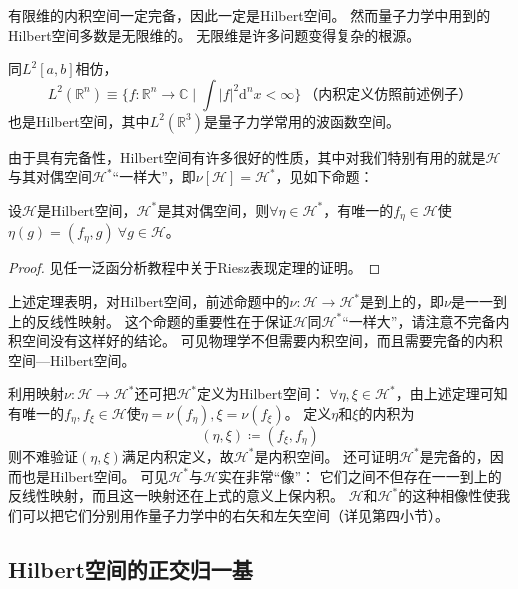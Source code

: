 \begin{note}
    有限维的内积空间一定完备，因此一定是Hilbert空间。
    然而量子力学中用到的Hilbert空间多数是无限维的。
    无限维是许多问题变得复杂的根源。
\end{note}

同$L^2[a, b]$相仿，
$$L^2(\mathbb{R}^n) \equiv \{f \colon \mathbb{R}^n \to \mathbb{C} \mid \int|f|^2\mathrm{d}^nx < \infty\} ~ \text{（内积定义仿照前述例子）}$$
也是Hilbert空间，其中$L^2(\mathbb{R}^3)$是量子力学常用的波函数空间。

由于具有完备性，Hilbert空间有许多很好的性质，其中对我们特别有用的就是$\mathscr{H}$与其对偶空间$\mathscr{H}^*$``一样大''，即$\nu[\mathscr{H}] = \mathscr{H}^*$，见如下命题：

\begin{theorem}
    设$\mathscr{H}$是Hilbert空间，$\mathscr{H}^*$是其对偶空间，则$\forall \eta \in \mathscr{H}^*$，有唯一的$f_\eta \in \mathscr{H}$使$\eta(g) = (f_\eta, g) ~ \forall g \in \mathscr{H}$。
\end{theorem}

\begin{proof}
    见任一泛函分析教程中关于Riesz表现定理的证明。
\end{proof}

\begin{note}
    上述定理表明，对Hilbert空间，前述命题中的$\nu \colon \mathscr{H} \to \mathscr{H}^*$是到上的，即$\nu$是一一到上的反线性映射。
    这个命题的重要性在于保证$\mathscr{H}$同$\mathscr{H}^*$``一样大''，请注意不完备内积空间没有这样好的结论。
    可见物理学不但需要内积空间，而且需要完备的内积空间---Hilbert空间。
\end{note}

利用映射$\nu \colon \mathscr{H} \to \mathscr{H}^*$还可把$\mathscr{H}^*$定义为Hilbert空间：
$\forall \eta, \xi \in \mathscr{H}^*$，由上述定理可知有唯一的$f_\eta, f_\xi \in \mathscr{H}$使$\eta = \nu(f_\eta), \xi = \nu(f_\xi)$。
定义$\eta$和$\xi$的内积为
$$(\eta, \xi) \coloneq (f_\xi, f_\eta)$$
则不难验证$(\eta, \xi)$满足内积定义，故$\mathscr{H}^*$是内积空间。
还可证明$\mathscr{H}^*$是完备的，因而也是Hilbert空间。
可见$\mathscr{H}^*$与$\mathscr{H}$实在非常``像''：
它们之间不但存在一一到上的反线性映射，而且这一映射还在上式的意义上保内积。
$\mathscr{H}$和$\mathscr{H}^*$的这种相像性使我们可以把它们分别用作量子力学中的右矢和左矢空间（详见第四小节）。

\subsection{Hilbert空间的正交归一基}

